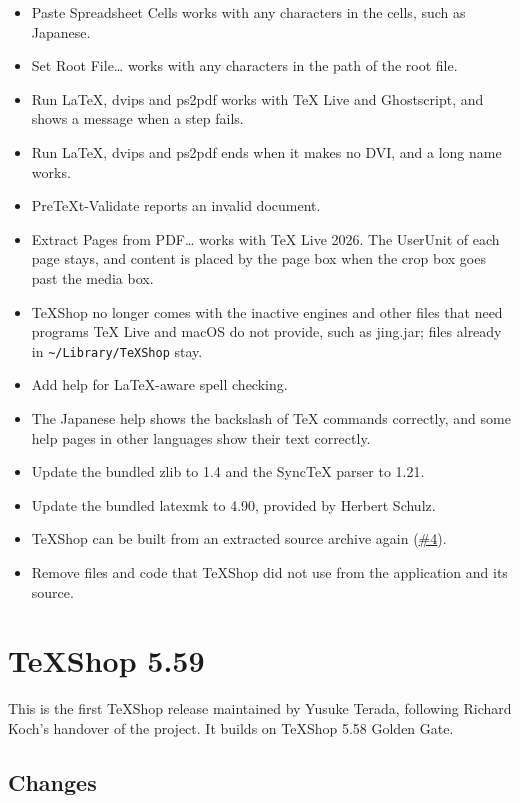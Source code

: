 \documentclass[11pt,letterpaper]{article}
\begin{document}
\begin{itemize}
\item Paste Spreadsheet Cells works with any characters in the cells, such as Japanese.
\item Set Root File… works with any characters in the path of the root file.
\item Run LaTeX, dvips and ps2pdf works with TeX Live and Ghostscript, and shows a message when a step fails.
\item Run LaTeX, dvips and ps2pdf ends when it makes no DVI, and a long name works.
\item PreTeXt-Validate reports an invalid document.
\item Extract Pages from PDF… works with TeX Live 2026. The UserUnit of each page stays, and content is placed by the page box when the crop box goes past the media box.
\item TeXShop no longer comes with the inactive engines and other files that need programs TeX Live and macOS do not provide, such as jing.jar; files already in \texttt{\textasciitilde{}/Library/TeXShop} stay.
\item Add help for LaTeX-aware spell checking.
\item The Japanese help shows the backslash of TeX commands correctly, and some help pages in other languages show their text correctly.
\item Update the bundled zlib to 1.4 and the SyncTeX parser to 1.21.
\item Update the bundled latexmk to 4.90, provided by Herbert Schulz.
\item TeXShop can be built from an extracted source archive again (\href{https://github.com/TeXShopProject/TeXShop/issues/4}{\#4}).
\item Remove files and code that TeXShop did not use from the application and its source.
\end{itemize}
\clearpage
\section{TeXShop 5.59}

This is the first TeXShop release maintained by Yusuke Terada, following Richard Koch's handover of the project. It builds on TeXShop 5.58 Golden Gate.


\subsection{Changes}
\end{document}
